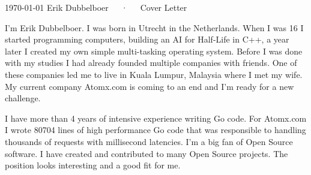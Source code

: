 \documentclass[11pt, a4paper]{awesome-cv}
\begin{document}
\makecvheader[R]

\makecvfooter
  {\today}
  {Erik Dubbelboer~~~·~~~Cover Letter}
  {}

\makelettertitle

\begin{cvletter}

I'm Erik Dubbelboer. I was born in Utrecht in the Netherlands. When I was 16 I started programming computers, building an AI for Half-Life in C++, a year later I created my own simple multi-tasking operating system. Before I was done with my studies I had already founded multiple companies with friends. One of these companies led me to live in Kuala Lumpur, Malaysia where I met my wife. My current company Atomx.com is coming to an end and I'm ready for a new challenge.

I have more than 4 years of intensive experience writing Go code. For Atomx.com I wrote 80704 lines of high performance Go code that was responsible to handling thousands of requests with millisecond latencies. I'm a big fan of Open Source software. I have created and contributed to many Open Source projects. The position looks interesting and a good fit for me.

\end{cvletter}


\makeletterclosing
\end{document}
